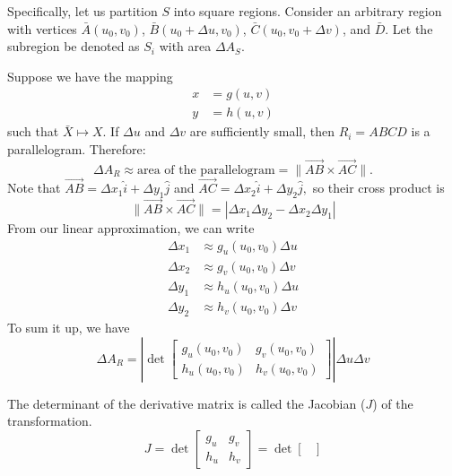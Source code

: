 \begin{itemize}
    Specifically, let us partition $S$ into square regions. Consider an arbitrary region with vertices $\bar{A}(u_0,v_0)$, $\bar{B}(u_0+\Delta u, v_0)$, $\bar{C}(u_0,v_0+\Delta v)$, and $\bar{D}$. Let the subregion be denoted as $S_i$ with area $\Delta A_S$.

    Suppose we have the mapping 
    \begin{align}
        x &= g(u,v) \\ 
        y &= h(u,v)
    \end{align}
    such that $\bar{X}\mapsto X$. If $\Delta u$ and $\Delta v$ are sufficiently small, then $R_i=ABCD$ is a parallelogram. Therefore: 
    \begin{equation}
        \Delta A_R \approx \text{area of the parallelogram} = \lVert \vec{AB} \times \vec{AC}\rVert.
    \end{equation} 
    Note that $\vec{AB}=\Delta x_1 \hat{i}+\Delta y_1 \hat{j}$ and $\vec{AC} = \Delta x_2\hat{i}+\Delta y_2 \hat{j},$ so their cross product is 
    \begin{equation}
        \lVert \vec{AB}\times \vec{AC} \rVert = |\Delta x_1\Delta y_2 - \Delta x_2\Delta y_1| 
    \end{equation}
    From our linear approximation, we can write 
    \begin{align}
        \Delta x_1 &\approx g_u(u_0,v_0)\Delta u \\ 
        \Delta x_2 &\approx g_v(u_0,v_0)\Delta v \\ 
        \Delta y_1 &\approx h_u(u_0,v_0)\Delta u \\ 
        \Delta y_2 &\approx h_v(u_0,v_0)\Delta v
    \end{align}
    To sum it up, we have 
    \begin{equation}
        \Delta A_R = \left|\det \begin{bmatrix}
            g_u(u_0,v_0) & g_v(u_0,v_0) \\ 
            h_u(u_0,v_0) & h_v(u_0,v_0)
        \end{bmatrix}\right| \Delta u\Delta v
    \end{equation}
    \begin{definition}
        The determinant of the derivative matrix is called the Jacobian ($J$) of the transformation. 
        \begin{equation}
            J = \det \begin{bmatrix}
                g_u & g_v \\ 
                h_u & h_v
            \end{bmatrix} = \det\begin{bmatrix}

\end{bmatrix}
\end{equation}
\end{definition}
\end{itemize}
